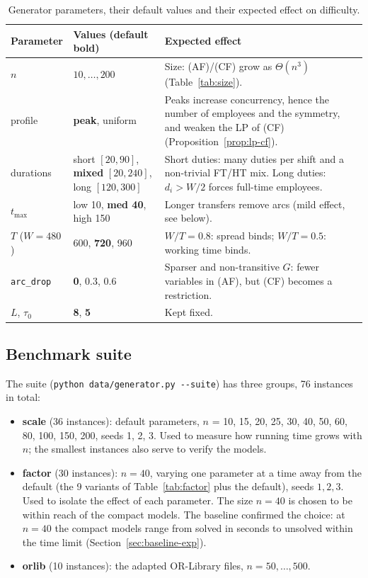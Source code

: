 \begin{table}[ht]
\centering
\small
\caption{Generator parameters, their default values and their expected
effect on difficulty.}
\label{tab:params}
\begin{tabular}{@{}lp{3.6cm}p{8.0cm}@{}}
\toprule
Parameter & Values (default \textbf{bold}) & Expected effect \\
\midrule
$n$ & $10,\dots,200$ & Size: (AF)/(CF) grow as $\Theta(n^3)$
  (Table~\ref{tab:size}). \\
profile & \textbf{peak}, uniform & Peaks increase concurrency, hence the
  number of employees and the symmetry, and weaken the LP of (CF)
  (Proposition~\ref{prop:lp-cf}). \\
durations & short $[20,90]$, \textbf{mixed} $[20,240]$, \newline long $[120,300]$ &
  Short duties: many duties per shift and a non-trivial FT/HT mix. Long
  duties: $d_i>W/2$ forces full-time employees. \\
$t_{\max}$ & low 10, \textbf{med 40}, high 150 & Longer transfers remove
  arcs (mild effect, see below). \\
$T$ ($W=480$) & 600, \textbf{720}, 960 & $W/T=0.8$: spread binds;
  $W/T=0.5$: working time binds. \\
\texttt{arc\_drop} & \textbf{0}, 0.3, 0.6 & Sparser and non-transitive $G$:
  fewer variables in (AF), but (CF) becomes a restriction. \\
$L$, $\tau_0$ & \textbf{8}, \textbf{5} & Kept fixed. \\
\bottomrule
\end{tabular}
\end{table}

\subsection{Benchmark suite}
\label{sec:suite}

The suite (\texttt{python data/generator.py -{}-suite}) has three groups, 76
instances in total:
\begin{itemize}[nosep]
  \item \textbf{scale} (36 instances): default parameters,
    $n$ = 10, 15, 20, 25, 30, 40, 50, 60, 80, 100, 150, 200, seeds 1, 2, 3. Used to
    measure how running time grows with $n$; the smallest instances also
    serve to verify the models.
  \item \textbf{factor} (30 instances): $n=40$, varying one parameter at a
    time away from the default (the 9 variants of Table~\ref{tab:factor} plus
    the default), seeds $1,2,3$. Used to isolate the effect of each
    parameter. The size $n=40$ is chosen to be within reach of the compact
    models. The baseline confirmed the choice: at $n=40$ the compact models
    range from solved in seconds to unsolved within the time limit
    (Section~\ref{sec:baseline-exp}).
  \item \textbf{orlib} (10 instances): the adapted OR-Library files,
    $n=50,\dots,500$.
\end{itemize}

